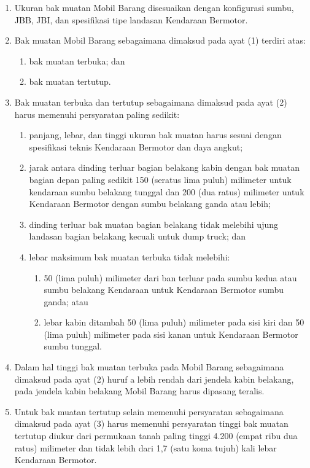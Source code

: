\begin{enumerate}[nolistsep]
  \item Ukuran bak muatan Mobil Barang disesuaikan dengan konfigurasi sumbu, JBB, JBI, dan spesifikasi tipe landasan Kendaraan Bermotor.
  \item Bak muatan Mobil Barang sebagaimana dimaksud pada ayat (1) terdiri atas:
  \begin{enumerate}[nolistsep]
    \item bak muatan terbuka; dan
    \item bak muatan tertutup. 
  \end{enumerate}
  \item Bak muatan terbuka dan tertutup sebagaimana dimaksud pada ayat (2) harus memenuhi persyaratan paling sedikit:
  \begin{enumerate}[nolistsep]
    \item panjang, lebar, dan tinggi ukuran bak muatan harus sesuai dengan spesifikasi teknis Kendaraan Bermotor dan daya angkut;
    \item jarak antara dinding terluar bagian belakang kabin dengan bak muatan bagian depan paling sedikit 150 (seratus lima puluh) milimeter untuk kendaraan sumbu belakang tunggal dan 200 (dua ratus) milimeter untuk Kendaraan Bermotor dengan sumbu belakang ganda atau lebih;
    \item dinding terluar bak muatan bagian belakang tidak melebihi ujung landasan bagian belakang kecuali untuk dump truck; dan
    \item lebar maksimum bak muatan terbuka tidak melebihi:
    \begin{enumerate}[nolistsep]
      \item 50 (lima puluh) milimeter dari ban terluar pada sumbu kedua atau sumbu belakang Kendaraan untuk Kendaraan Bermotor sumbu ganda; atau
      \item lebar kabin ditambah 50 (lima puluh) milimeter pada sisi kiri dan 50 (lima puluh) milimeter pada sisi kanan untuk Kendaraan Bermotor sumbu tunggal.
    \end{enumerate} 
  \end{enumerate}
  \item Dalam hal tinggi bak muatan terbuka pada Mobil Barang sebagaimana dimaksud pada ayat (2) huruf a lebih rendah dari jendela kabin belakang, pada jendela kabin belakang Mobil Barang harus dipasang teralis.
  \item Untuk bak muatan tertutup selain memenuhi persyaratan sebagaimana dimaksud pada ayat (3) harus memenuhi persyaratan tinggi bak muatan tertutup diukur dari permukaan tanah paling tinggi 4.200 (empat ribu dua ratus) milimeter dan tidak lebih dari 1,7 (satu koma tujuh) kali lebar Kendaraan Bermotor.
\end{enumerate}

